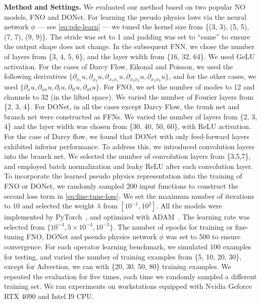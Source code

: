  \noindent\textbf{Method and Settings.} We evaluated our method based on two popular NO models, FNO and DONet. For learning the pseudo physics laws via the neural network $\phi$ --- see \eqref{eq:pde-learn} --- we tuned the kernel size from \{(3, 3), (5, 5), (7, 7), (9, 9)\}. The stride was set to 1 and padding was set to ``same'' to ensure the output shape does not change. In the subsequent FNN, we chose the number of layers from \{3, 4, 5, 6\}, and the layer width from \{16, 32, 64\}. We used {GeLU} activation. For the cases of Darcy Flow, Eikonal and Poisson, we used the following derivatives $\{\partial_{x_1} u, \partial_{x_2} u, \partial_{x_1x_1}u, \partial_{x_2x_2}u, \partial_{x_1x_2} u\}$, and for the other cases, we used $\{\partial_x u, \partial_{xx} u, \partial_t u, \partial_{tt} u, \partial_{xt} u\}$. 
For FNO, we set the number of modes to 12 and channels to 32 (in the lifted space). We varied the number of Fourier layers from \{2, 3, 4\}. For DONet, in all the cases except Darcy Flow,  the trunk net and branch net were constructed as FFNs. We varied the number of layers from \{2, 3, 4\} and the layer width was chosen from \{30, 40, 50, 60\}, with ReLU activation. For the case of Darcy flow, we found that DONet with only feed-forward layers exhibited inferior performance. To address this, we introduced convolution layers into the branch net. We selected the number of convolution layers from \{3,5,7\}, and employed batch normalization and leaky ReLU after each convolution layer.
To incorporate the learned pseudo physics representation into the training of FNO or DONet,  we randomly sampled 200 input functions to construct the second loss term in  \eqref{eq:fine-tune-loss}. 
We set the maximum number of iterations to $10$ and selected the weight $\lambda$ from $[10^{-1}, 10^{2}]$. 
All the models were implemented by PyTorch~\citep{paszke2019pytorch}, and optimized with ADAM~\citep{kingma2014adam}. The learning rate was selected from $\{10^{-4}, 5\times 10^{-4}, 10^{-3}\}$. The number of epochs for training or fine-tuning FNO, DONet and pseudo physics network $\phi$ was set to 500 to ensure convergence. 
For each operator learning benchmark, we simulated 100 examples for testing, and varied the number of training examples from \{5, 10, 20, 30\}, except for Advection, we ran with \{20, 30, 50, 80\} training examples. 
We repeated the evaluation for five times, each time we randomly sampled a different training set. We ran experiments on workstations equipped with Nvidia Geforce RTX 4090 and Intel I9 CPU. 

